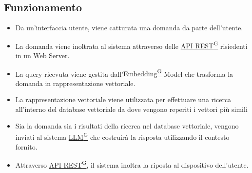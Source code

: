 \documentclass{article}
\begin{document}
    \subsection{Funzionamento}
    \begin{itemize}
        \item Da un’interfaccia utente, viene catturata una domanda da parte dell’utente.
        \item La domanda viene inoltrata al sistema attraverso delle \href{https://code7crusaders.github.io/docs/RTB/documentazione_interna/glossario.html#api-rest-representational-state-transfer}{API REST\textsuperscript{G}} risiedenti in un Web Server.
        \item La query ricevuta viene gestita dall’\href{https://code7crusaders.github.io/docs/RTB/documentazione_interna/glossario.html#embedding}{Embedding\textsuperscript{G}} Model che trasforma la domanda in rappresentazione vettoriale.
        \item La rappresentazione vettoriale viene utilizzata per effettuare una ricerca all’interno del database vettoriale da dove vengono reperiti i vettori più simili
        \item Sia la domanda sia i risultati della ricerca nel database vettoriale, vengono inviati al sistema \href{https://code7crusaders.github.io/docs/RTB/documentazione_interna/glossario.html#llm-large-language-model}{LLM\textsuperscript{G}} che costruirà la risposta utilizzando il contesto fornito.
        \item Attraverso \href{https://code7crusaders.github.io/docs/RTB/documentazione_interna/glossario.html#api-rest-representational-state-transfer}{API REST\textsuperscript{G}}, il sistema inoltra la riposta al dispositivo dell’utente.
    \end{itemize}
\end{document}

